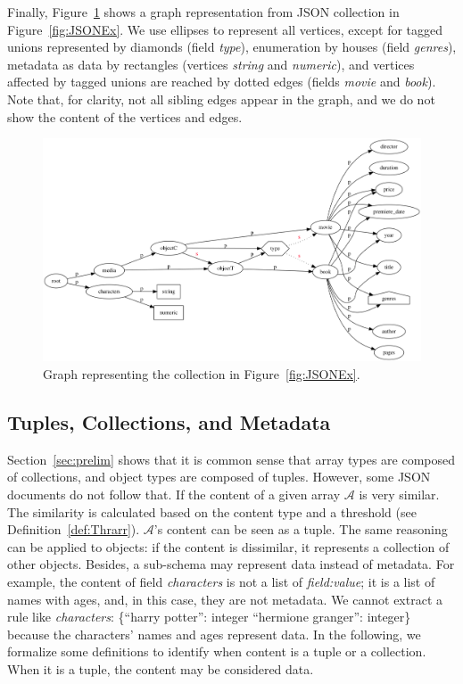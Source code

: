 Finally, Figure~\ref{fig:graphcoll} shows a graph representation from JSON collection in Figure~\ref{fig:JSONEx}. 
We use ellipses to represent all vertices, except for tagged unions represented by diamonds (field \textit{type}), enumeration by houses (field \textit{genres}), metadata as data by rectangles (vertices \textit{string} and \textit{numeric}), and vertices affected by tagged unions are reached by dotted edges (fields \textit{movie} and \textit{book}). 
Note that, for clarity, not all sibling edges appear in the graph, and we do not show the content of the vertices and edges.

\begin{figure}[ht]
    \centering
    \includegraphics[scale=.35]{Figures/JSONgraph.png}
    \caption{Graph representing the collection in Figure~\ref{fig:JSONEx}.}
    \label{fig:graphcoll}
\end{figure}

\subsection{Tuples, Collections, and Metadata}

Section~\ref{sec:prelim} shows that it is common sense that array types are composed of collections, and object types are composed of tuples. 
However, some JSON documents do not follow that. If the content of a given array $\mathcal{A}$ is very similar. The similarity is calculated based on the content type and a threshold (see Definition~\ref{def:Thrarr}).  
$\mathcal{A}$'s content can be seen as a tuple. 
The same reasoning can be applied to objects: if the content is dissimilar, it represents a collection of other objects. 
Besides, a sub-schema may represent data instead of metadata. 
For example, the content of field \textit{characters} is not a list of \textit{field:value}; it is a list of names with ages, and, in this case, they are not metadata. 
We cannot extract a rule like \textit{characters}: \{``harry potter'': integer ``hermione granger'': integer\} because the characters' names and ages represent data. 
In the following, we formalize some definitions to identify when content is a tuple or a collection. When it is a tuple, the content may be considered data.

